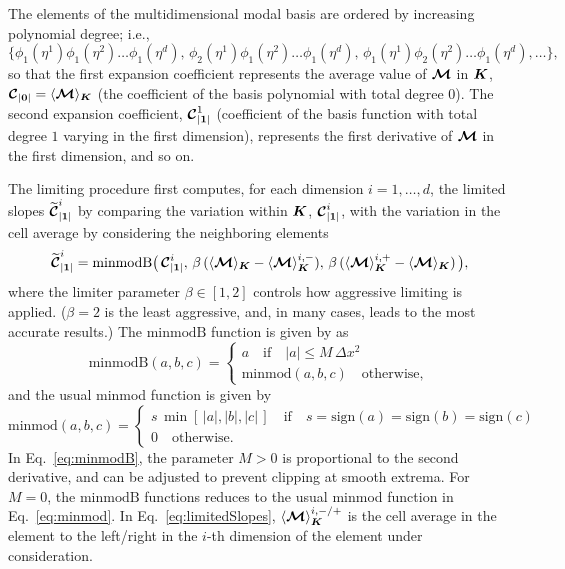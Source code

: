 \documentclass[10pt,preprint]{aastex}
\begin{document}
The elements of the multidimensional modal basis are ordered by increasing polynomial degree; i.e., 
\begin{equation}
  \{\phi_{1}(\eta^{1})\phi_{1}(\eta^{2})\ldots\phi_{1}(\eta^{d}),\,\phi_{2}(\eta^{1})\phi_{1}(\eta^{2})\ldots\phi_{1}(\eta^{d}),\,\phi_{1}(\eta^{1})\phi_{2}(\eta^{2})\ldots\phi_{1}(\eta^{d}),\ldots\},
\end{equation}
so that the first expansion coefficient represents the average value of $\boldsymbol{\mathcal{M}}$ in $\boldsymbol{K}$, $\boldsymbol{\mathcal{C}}_{|\boldsymbol{0}|}=\langle\boldsymbol{\mathcal{M}}\rangle_{\boldsymbol{K}}$ (the coefficient of the basis polynomial with total degree $0$).  
The second expansion coefficient, $\boldsymbol{\mathcal{C}}_{|\boldsymbol{1}|}^{1}$ (coefficient of the basis function with total degree $1$ varying in the first dimension), represents the first derivative of $\boldsymbol{\mathcal{M}}$ in the first dimension, and so on.  

The limiting procedure first computes, for each dimension $i=1,\ldots,d$, the limited slopes $\widetilde{\boldsymbol{\mathcal{C}}}_{|\boldsymbol{1}|}^{i}$ by comparing the variation within $\boldsymbol{K}$, $\boldsymbol{\mathcal{C}}_{|\boldsymbol{1}|}^{i}$, with the variation in the cell average by considering the neighboring elements
\begin{equation}
  \widetilde{\boldsymbol{\mathcal{C}}}_{|\boldsymbol{1}|}^{i}
  =\text{minmodB}
  \big(\,
    \boldsymbol{\mathcal{C}}_{|\boldsymbol{1}|}^{i},\,
    \beta\,(\langle\boldsymbol{\mathcal{M}}\rangle_{\boldsymbol{K}}-\langle\boldsymbol{\mathcal{M}}\rangle_{\boldsymbol{K}}^{i,-}),\,
    \beta\,(\langle\boldsymbol{\mathcal{M}}\rangle_{\boldsymbol{K}}^{i,+}-\langle\boldsymbol{\mathcal{M}}\rangle_{\boldsymbol{K}})
  \,\big),
  \label{eq:limitedSlopes}
\end{equation}
where the limiter parameter $\beta\in[1,2]$ controls how aggressive limiting is applied.  
($\beta=2$ is the least aggressive, and, in many cases, leads to the most accurate results.)  
The $\text{minmodB}$ function is given by \citet{cockburnShu_2001} as
\begin{equation}
  \mbox{minmodB}(a,b,c)
  =\left\{\begin{array}{ll}
  a \quad\text{if}\quad |a|\le M\,\Delta x^{2} \\
  \mbox{minmod}(a,b,c) \quad \text{otherwise},
  \end{array}\right.
  \label{eq:minmodB}
\end{equation}
and the usual minmod function is given by
\begin{equation}
  \mbox{minmod}(a,b,c)
  =\left\{\begin{array}{ll}
  s\,\min[\,|a|,|b|,|c|\,] \quad\text{if}\quad s=\mbox{sign}(a)=\mbox{sign}(b)=\mbox{sign}(c) \\
  0 \quad \text{otherwise}.
  \end{array}\right.
  \label{eq:minmod}
\end{equation}
In Eq.~\eqref{eq:minmodB}, the parameter $M>0$ is proportional to the second derivative, and can be adjusted to prevent clipping at smooth extrema.  
For $M=0$, the $\text{minmodB}$ functions reduces to the usual minmod function in Eq.~\eqref{eq:minmod}.  
In Eq.~\eqref{eq:limitedSlopes}, $\langle\boldsymbol{\mathcal{M}}\rangle_{\boldsymbol{K}}^{i,-/+}$ is the cell average in the element to the left/right in the $i$-th dimension of the element under consideration.  
\end{document}
